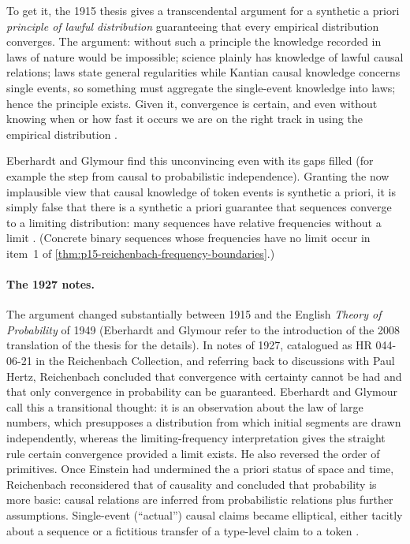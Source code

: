 To get it, the 1915 thesis gives a transcendental argument for a
synthetic a priori \emph{principle of lawful distribution} guaranteeing
that every empirical distribution converges. The argument: without such
a principle the knowledge recorded in laws of nature would be
impossible; science plainly has knowledge of lawful causal relations;
laws state general regularities while Kantian causal knowledge concerns
single events, so something must aggregate the single-event knowledge
into laws; hence the principle exists. Given it, convergence is certain,
and even without knowing when or how fast it occurs we are on the right
track in using the empirical distribution
\cite[p.~363]{EberhardtGlymour2011ReichenbachReading}.

Eberhardt and Glymour find this unconvincing even with its gaps filled (for
example the step from causal to probabilistic independence). Granting
the now implausible view that causal knowledge of token events is
synthetic a priori, it is simply false that there is a synthetic a
priori guarantee that sequences converge to a limiting distribution:
many sequences have relative frequencies without a limit
\cite[p.~364]{EberhardtGlymour2011ReichenbachReading}. (Concrete binary
sequences whose frequencies have no limit occur in item~1 of
\cref{thm:p15-reichenbach-frequency-boundaries}.)

\paragraph{The 1927 notes.} The argument changed substantially between
1915 and the English \emph{Theory of Probability} of 1949 (Eberhardt and Glymour
refer to the introduction of the 2008 translation of the thesis for the
details). In notes of 1927, catalogued as HR 044-06-21 in the
Reichenbach Collection, and referring back to discussions with Paul
Hertz, Reichenbach concluded that convergence with certainty cannot be
had and that only convergence in probability can be guaranteed. Eberhardt and Glymour call this a transitional thought: it is an observation about the
law of large numbers, which presupposes a distribution from which
initial segments are drawn independently, whereas the limiting-frequency
interpretation gives the straight rule certain convergence provided a
limit exists. He also reversed the order of primitives. Once Einstein
had undermined the a priori status of space and time, Reichenbach
reconsidered that of causality and concluded that probability is more
basic: causal relations are inferred from probabilistic relations plus
further assumptions. Single-event (``actual'') causal claims became
elliptical, either tacitly about a sequence or a fictitious transfer of
a type-level claim to a token
\cite[p.~364 and nn.~2--3]{EberhardtGlymour2011ReichenbachReading}.

